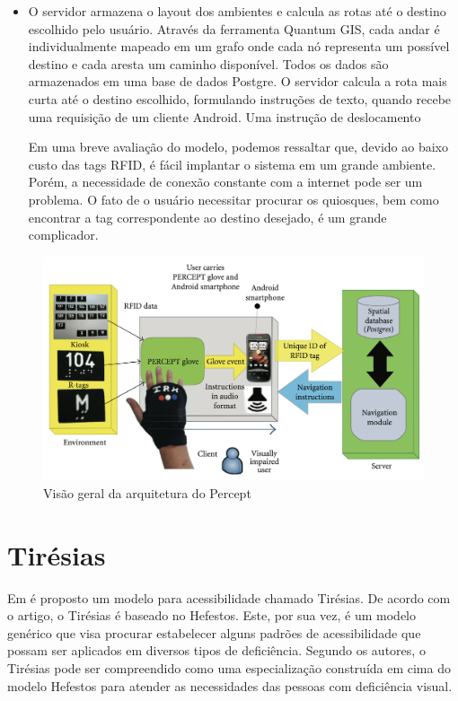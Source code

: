 \documentclass[english,brazilian]{UNISINOSmonografia}
\begin{document}
\begin{itemize}
	\item O servidor armazena o layout dos ambientes e calcula as rotas até o destino escolhido pelo usuário. Através da ferramenta Quantum GIS, cada andar é individualmente mapeado em um grafo onde cada nó representa um possível destino e cada aresta um caminho disponível. Todos os dados são armazenados em uma base de dados Postgre. O servidor calcula a rota mais curta até o destino escolhido, formulando instruções de texto, quando recebe uma requisição de um cliente Android. Uma instrução de deslocamento 

	Em uma breve avaliação do modelo, podemos ressaltar que, devido ao baixo custo das tags RFID, é fácil implantar o sistema em um grande ambiente. Porém, a necessidade de conexão constante com a internet pode ser um problema. O fato de o usuário necessitar procurar os quiosques, bem como encontrar a tag correspondente ao destino desejado, é um grande complicador.
\end{itemize}

\FloatBarrier
	\begin{figure}
		\caption{Visão geral da arquitetura do Percept}
		\label{fig:visaoGeralPercept}
		\centering%
		\begin{minipage}{.9\textwidth}
			\includegraphics[width=\textwidth]{imgs/perceptArquitetura}
		\end{minipage}
	\end{figure}
\FloatBarrier

	\section{Tirésias}
Em  é proposto um modelo para acessibilidade chamado Tirésias. De acordo com o artigo, o Tirésias é baseado no Hefestos. Este, por sua vez, é um modelo genérico que visa procurar estabelecer alguns padrões de acessibilidade que possam ser aplicados em diversos tipos de deficiência. Segundo os autores, o Tirésias pode ser compreendido como uma especialização construída em cima do modelo Hefestos para atender as necessidades das pessoas com deficiência visual. 
\end{document}
